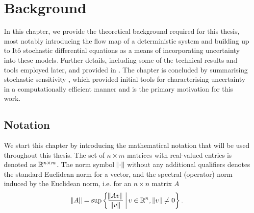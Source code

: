 
\chapter{Background}\label{ch:background}
In this chapter, we provide the theoretical background required for this thesis, most notably introducing the flow map of a deterministic system and building up to It\^o stochastic differential equations as a means of incorporating uncertainty into these models.
Further details, including some of the technical results and tools employed later, and provided in .
The chapter is concluded by summarising stochastic sensitivity \citep{Balasuriya_2020_StochasticSensitivityComputable}, which provided initial tools for characterising uncertainty in a computationally efficient manner and is the primary motivation for this work.





\section{Notation}
We start this chapter by introducing the mathematical notation that will be used throughout this thesis.
The set of \(n \times m\) matrices with real-valued entries is denoted as \(\mathbb{R}^{n\times m}\).
The norm symbol \(\norm{\cdot}\) without any additional qualifiers denotes the standard Euclidean norm for a vector, and the spectral (operator) norm induced by the Euclidean norm, i.e. for an \(n \times n\) matrix \(A\)
\[
	\norm{A} = \sup\left\{\frac{\norm{Av}}{\norm{v}}\,\middle|\,v \in \mathbb{R}^n, \, \norm{v} \neq 0\right\}.
\]

